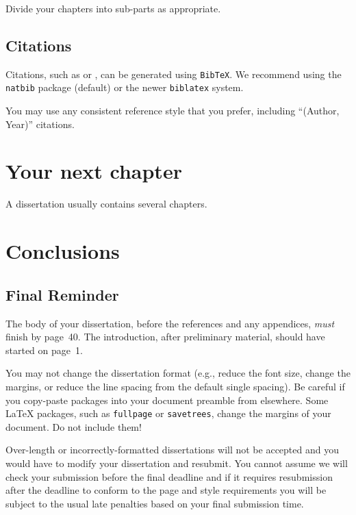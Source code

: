 \documentclass[logo,bsc,singlespacing,parskip]{infthesis}
\theoremstyle{definition}
\theoremstyle{example}
\theoremstyle{theorem}
\theoremstyle{theorem}
\theoremstyle{theorem}
\theoremstyle{theorem}
\theoremstyle{theorem}
\theoremstyle{definition}
\theoremstyle{definition}
\theoremstyle{definition}
\begin{document}
Divide your chapters into sub-parts as appropriate.

\section{Citations}

Citations, such as \citet{P1} or \citep{P2}, can be generated using
\texttt{BibTeX}. We recommend using the \texttt{natbib} package (default) or the newer \texttt{biblatex} system. 

You may use any consistent reference style that you prefer, including ``(Author, Year)'' citations. 






\chapter{Your next chapter}

A dissertation usually contains several chapters.

\chapter{Conclusions}

\section{Final Reminder}

The body of your dissertation, before the references and any appendices,
\emph{must} finish by page~40. The introduction, after preliminary material,
should have started on page~1.

You may not change the dissertation format (e.g., reduce the font size, change
the margins, or reduce the line spacing from the default single spacing). Be
careful if you copy-paste packages into your document preamble from elsewhere.
Some \LaTeX{} packages, such as \texttt{fullpage} or \texttt{savetrees}, change
the margins of your document. Do not include them!

Over-length or incorrectly-formatted dissertations will not be accepted and you
would have to modify your dissertation and resubmit. You cannot assume we will
check your submission before the final deadline and if it requires resubmission
after the deadline to conform to the page and style requirements you will be
subject to the usual late penalties based on your final submission time.
\end{document}
